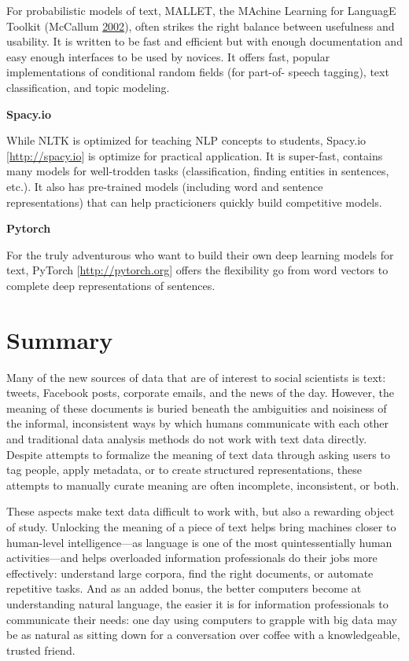 \documentclass[]{krantz}
\begin{document}
For probabilistic models of text, MALLET, the MAchine Learning for
LanguagE Toolkit (McCallum \protect\hyperlink{ref-mallet}{2002}), often
strikes the right balance between usefulness and usability. It is
written to be fast and efficient but with enough documentation and easy
enough interfaces to be used by novices. It offers fast, popular
implementations of conditional random fields (for part-of- speech
tagging), text classification, and topic modeling.

\textbf{Spacy.io}

While NLTK is optimized for teaching NLP concepts to students, Spacy.io
{[}\url{http://spacy.io}{]} is optimize for practical application. It is
super-fast, contains many models for well-trodden tasks (classification,
finding entities in sentences, etc.). It also has pre-trained models
(including word and sentence representations) that can help
practicioners quickly build competitive models.

\textbf{Pytorch}

For the truly adventurous who want to build their own deep learning
models for text, PyTorch {[}\url{http://pytorch.org}{]} offers the
flexibility go from word vectors to complete deep representations of
sentences.

\section{Summary}\label{summary-4}

Many of the new sources of data that are of interest to social
scientists is text: tweets, Facebook posts, corporate emails, and the
news of the day. However, the meaning of these documents is buried
beneath the ambiguities and noisiness of the informal, inconsistent ways
by which humans communicate with each other and traditional data
analysis methods do not work with text data directly. Despite attempts
to formalize the meaning of text data through asking users to tag
people, apply metadata, or to create structured representations, these
attempts to manually curate meaning are often incomplete, inconsistent,
or both.

These aspects make text data difficult to work with, but also a
rewarding object of study. Unlocking the meaning of a piece of text
helps bring machines closer to human-level intelligence---as language is
one of the most quintessentially human activities---and helps overloaded
information professionals do their jobs more effectively: understand
large corpora, find the right documents, or automate repetitive tasks.
And as an added bonus, the better computers become at understanding
natural language, the easier it is for information professionals to
communicate their needs: one day using computers to grapple with big
data may be as natural as sitting down for a conversation over coffee
with a knowledgeable, trusted friend.
\end{document}
